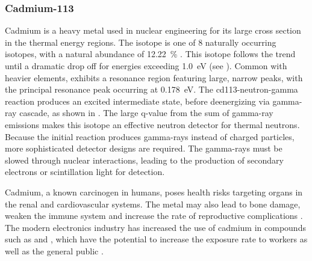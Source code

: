\documentclass[../../../../main.tex]{subfiles}
\begin{document}
%
    \subsubsection{Cadmium-113}%
    \label{sec:chapter-2:radiation-detection:neutron-interactions:cadmium-113}%
    Cadmium is a heavy metal used in nuclear engineering for its large cross section in the thermal energy regions.
    The isotope  is one of 8 naturally occurring isotopes, with a natural abundance of \SI{12.22}{\percent} \cite{Chadwick_2011}.
    This isotope follows the  trend until a dramatic drop off for energies exceeding \Xmath{\sim}\SI{1.0}{\electronvolt} (see ).
    Common with heavier elements,  exhibits a resonance region featuring large, narrow peaks, with the principal resonance peak occurring at \SI{0.178}{\electronvolt}.
    The \gls{cd113-neutron-gamma} reaction produces an excited intermediate state, before deenergizing via \gls{gamma-ray} cascade, as shown in  \cite{Pringle_1952, Rusev_2013}.
    The large \gls{q-value} from the sum of \gls{gamma-ray} emissions makes this isotope an effective neutron detector for thermal neutrons.
    Because the initial reaction produces \glspl{gamma-ray} instead of charged particles, more sophisticated detector designs are required.
    The \glspl{gamma-ray} must be slowed through nuclear interactions, leading to the production of secondary electrons or scintillation light for detection.
    \par%
    Cadmium, a known carcinogen in humans, poses health risks targeting organs in the renal and cardiovascular systems.
    The metal may also lead to bone damage, weaken the immune system and increase the rate of reproductive complications \cite{Godt_2006}.
    The modern electronics industry has increased the use of cadmium in compounds such as  and , which have the potential to increase the exposure rate to workers as well as the general public \cite{Fowler_2009}.
\end{document}

